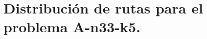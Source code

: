 \documentclass[a4paper,10pt,twocolumn]{article}
\begin{document}
	
	
	
	
	

	\section*{Distribución de rutas para el problema A-n33-k5.}
	\label{tab:result33_5}
\end{document}
